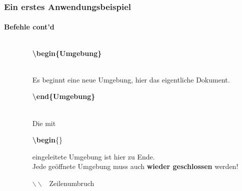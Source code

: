 \begin{frame}
\frametitle{Ein erstes Anwendungsbeispiel}
\framesubtitle{Befehle cont'd}
\begin{columns}
\begin{column}{0.55\textwidth}
\begin{ttfamily}\footnotesize

 \normalsize
\end{ttfamily}
\end{column}
\begin{column}{0.45\textwidth}
\begin{ttfamily}\textbf{\color{unibablueI}\textbackslash begin\color{black}\{Umgebung\}}\end{ttfamily}\\
Es beginnt eine neue Umgebung, hier das eigentliche Dokument.\\[5mm]

\begin{ttfamily}\textbf{\color{unibablueI}\textbackslash end\color{black}\{Umgebung\}}\end{ttfamily}\\
Die mit \begin{ttfamily}\textbf{\color{unibablueI}\textbackslash begin}\color{black}\{\}\end{ttfamily}
eingeleitete Umgebung ist hier zu Ende.\\
Jede geöffnete Umgebung muss auch \textbf{wieder geschlossen} werden!
\\[5mm]

\begin{ttfamily}\textbf{\color{nounibaredII}$\backslash\backslash$}\color{black}
~Zeilenumbruch\end{ttfamily}\\
\end{column}
\end{columns}
\end{frame}



